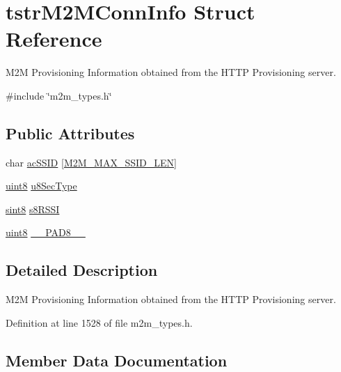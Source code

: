 \hypertarget{structtstrM2MConnInfo}{}\section{tstr\+M2\+M\+Conn\+Info Struct Reference}
\label{structtstrM2MConnInfo}


M2M Provisioning Information obtained from the H\+T\+TP Provisioning server.  




{\ttfamily \#include \char`\"{}m2m\+\_\+types.\+h\char`\"{}}

\subsection*{Public Attributes}
\begin{DoxyCompactItemize}
\item 
char \hyperlink{structtstrM2MConnInfo_af19cf4e326663fde8038b30b6145758b}{ac\+S\+S\+ID} \mbox{[}\hyperlink{group__WlanDefines_gab2bd95c18ede2fbc07b44c5660cc0097}{M2\+M\+\_\+\+M\+A\+X\+\_\+\+S\+S\+I\+D\+\_\+\+L\+EN}\mbox{]}
\item 
\hyperlink{group__DataT_ga4df709a77647e870bbf1d955b8edc9a6}{uint8} \hyperlink{structtstrM2MConnInfo_af8eee50f79405eb3ad9d4be4eb73fc01}{u8\+Sec\+Type}
\item 
\hyperlink{group__DataT_gae35f10ffd0ac8dd2bc3e794da9bdfbc7}{sint8} \hyperlink{structtstrM2MConnInfo_ae043d4268b0e13c398bf001f7f8765ec}{s8\+R\+S\+SI}
\item 
\hyperlink{group__DataT_ga4df709a77647e870bbf1d955b8edc9a6}{uint8} \hyperlink{structtstrM2MConnInfo_a8e3ed5bb21973e7bd4fd22e2b23e177d}{\+\_\+\+\_\+\+P\+A\+D8\+\_\+\+\_\+}
\end{DoxyCompactItemize}


\subsection{Detailed Description}
M2M Provisioning Information obtained from the H\+T\+TP Provisioning server. 

Definition at line 1528 of file m2m\+\_\+types.\+h.



\subsection{Member Data Documentation}
\mbox{\label{structtstrM2MConnInfo_a8e3ed5bb21973e7bd4fd22e2b23e177d}} 
